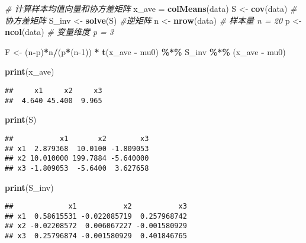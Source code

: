 \documentclass[
]{ctex}
\newenvironment{Shaded}{\begin{snugshade}}{\end{snugshade}}
\newcommand{\CommentTok}[1]{\textcolor[rgb]{0.56,0.35,0.01}{\textit{#1}}}
\newcommand{\DecValTok}[1]{\textcolor[rgb]{0.00,0.00,0.81}{#1}}
\newcommand{\FunctionTok}[1]{\textcolor[rgb]{0.13,0.29,0.53}{\textbf{#1}}}
\newcommand{\NormalTok}[1]{#1}
\newcommand{\OtherTok}[1]{\textcolor[rgb]{0.56,0.35,0.01}{#1}}
\newcommand{\SpecialCharTok}[1]{\textcolor[rgb]{0.81,0.36,0.00}{\textbf{#1}}}
\begin{document}
\begin{Shaded}
\begin{Highlighting}[]
\CommentTok{\# 计算样本均值向量和协方差矩阵}
\NormalTok{x\_ave }\OtherTok{=} \FunctionTok{colMeans}\NormalTok{(data)}
\NormalTok{S }\OtherTok{\textless{}{-}} \FunctionTok{cov}\NormalTok{(data) }\CommentTok{\#协方差矩阵}
\NormalTok{S\_inv }\OtherTok{\textless{}{-}} \FunctionTok{solve}\NormalTok{(S) }\CommentTok{\#逆矩阵}
\NormalTok{n }\OtherTok{\textless{}{-}} \FunctionTok{nrow}\NormalTok{(data)  }\CommentTok{\# 样本量 n = 20}
\NormalTok{p }\OtherTok{\textless{}{-}} \FunctionTok{ncol}\NormalTok{(data)  }\CommentTok{\# 变量维度 p = 3}

\NormalTok{F }\OtherTok{\textless{}{-}}\NormalTok{ (n}\SpecialCharTok{{-}}\NormalTok{p)}\SpecialCharTok{*}\NormalTok{n}\SpecialCharTok{/}\NormalTok{(p}\SpecialCharTok{*}\NormalTok{(n}\DecValTok{{-}1}\NormalTok{)) }\SpecialCharTok{*} \FunctionTok{t}\NormalTok{(x\_ave }\SpecialCharTok{{-}}\NormalTok{ mu0) }\SpecialCharTok{\%*\%}\NormalTok{ S\_inv }\SpecialCharTok{\%*\%}\NormalTok{ (x\_ave }\SpecialCharTok{{-}}\NormalTok{ mu0)}

\FunctionTok{print}\NormalTok{(x\_ave)}
\end{Highlighting}
\end{Shaded}

\begin{verbatim}
##     x1     x2     x3 
##  4.640 45.400  9.965
\end{verbatim}

\begin{Shaded}
\begin{Highlighting}[]
\FunctionTok{print}\NormalTok{(S)}
\end{Highlighting}
\end{Shaded}

\begin{verbatim}
##           x1       x2        x3
## x1  2.879368  10.0100 -1.809053
## x2 10.010000 199.7884 -5.640000
## x3 -1.809053  -5.6400  3.627658
\end{verbatim}

\begin{Shaded}
\begin{Highlighting}[]
\FunctionTok{print}\NormalTok{(S\_inv)}
\end{Highlighting}
\end{Shaded}

\begin{verbatim}
##             x1           x2           x3
## x1  0.58615531 -0.022085719  0.257968742
## x2 -0.02208572  0.006067227 -0.001580929
## x3  0.25796874 -0.001580929  0.401846765
\end{verbatim}
\end{document}
